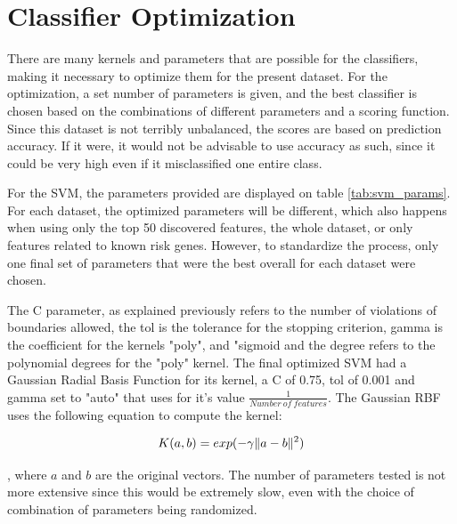 \section{Classifier Optimization}

There are many kernels and parameters that are possible for the classifiers, making it necessary to optimize them for the present dataset. For the optimization, a set number of parameters is given, and the best classifier is chosen based on the combinations of different parameters and a scoring function. Since this dataset is not terribly unbalanced, the scores are based on prediction accuracy. If it were, it would not be advisable to use accuracy as such, since it could be very high even if it misclassified one entire class.

For the \gls{SVM}, the parameters provided are displayed on table \ref{tab:svm_params}. For each dataset, the optimized parameters will be different, which also happens when using only the top 50 discovered features, the whole dataset, or only features related to known risk genes. However, to standardize the process, only one final set of parameters that were the best overall for each dataset were chosen. 

The C parameter, as explained previously refers to the number of violations of boundaries allowed, the tol is the tolerance for the stopping criterion, gamma is the coefficient for the kernels "poly", and "sigmoid and the degree refers to the polynomial degrees for the "poly" kernel. The final optimized \gls{SVM} had a Gaussian Radial Basis Function for its kernel, a C of 0.75, tol of 0.001 and gamma set to "auto" that uses for it's value $ \frac{1}{Number\ of\ features}$. The Gaussian \gls{RBF} uses the following equation to compute the kernel: 

\begin{equation}
K(a, b) = exp(-\gamma \lVert a-b\rVert^2) \\
\end{equation}

, where $a$ and $b$ are the original vectors. The number of parameters tested is not more extensive since this would be extremely slow, even with the choice of combination of parameters being randomized. 

